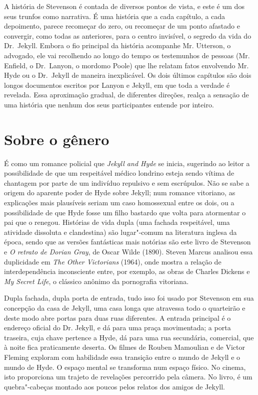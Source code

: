 A história de Stevenson é contada de diversos pontos de vista, e este é
um dos seus trunfos como narrativa.  É uma história que a cada
capítulo, a cada depoimento, parece recomeçar do zero, ou recomeçar de
um ponto afastado e convergir, como todas as anteriores, para o centro
invisível, o segredo da vida do Dr.~Jekyll.  Embora o fio principal da
história acompanhe Mr. Utterson, o advogado, ele vai recolhendo ao
longo do tempo os testemunhos de pessoas (Mr. Enfield, o Dr.~Lanyon, o
mordomo Poole) que lhe relatam fatos envolvendo Mr. Hyde ou o Dr.~Jekyll 
de maneira inexplicável. Os dois últimos capítulos são dois
longos documentos escritos por Lanyon e Jekyll, em que toda a verdade é
revelada.  Essa aproximação gradual, de diferentes direções, realça a
sensação de uma história que nenhum dos seus participantes entende por
inteiro.  



\section{Sobre o gênero}
É como um romance policial que \textit{Jekyll and Hyde} se inicia,
sugerindo ao leitor a possibilidade de que um respeitável médico
londrino esteja sendo vítima de chantagem por parte de um indivíduo
repulsivo e sem escrúpulos.  Não se sabe a origem do aparente poder de
Hyde sobre Jekyll; num romance vitoriano, as explicações mais
plausíveis seriam um caso homossexual entre os dois, ou a possibilidade
de que Hyde fosse um filho bastardo que volta para atormentar o pai que
o renegou.  Histórias de vida dupla (uma fachada respeitável, uma
atividade dissoluta e clandestina) são lugar"-comum na literatura
inglesa da época, sendo que as versões fantásticas mais notórias são
este livro de Stevenson e \textit{O retrato de Dorian
Gray}, de Oscar Wilde (1890).  Steven Marcus analisou essa duplicidade
em \textit{The Other Victorians} (1964), onde mostra a relação de
interdependência inconsciente entre, por exemplo, as obras de Charles
Dickens e \textit{My Secret Life}, o clássico anônimo da pornografia
vitoriana. 

Dupla fachada, dupla porta de entrada, tudo isso foi usado por Stevenson
em sua concepção da casa de Jekyll, uma casa longa que atravessa todo o
quarteirão e deste modo abre portas para duas ruas diferentes.  A
entrada principal é o endereço oficial do Dr. Jekyll, e dá para uma
praça movimentada; a porta traseira, cuja chave pertence a Hyde, dá
para uma rua secundária, comercial, que à noite fica praticamente
deserta.  Os filmes de Rouben Mamoulian e de Victor Fleming exploram
com habilidade essa transição entre o mundo de Jekyll e o mundo de
Hyde.  O espaço mental se transforma num espaço físico. No cinema, isto
proporciona um trajeto de revelações percorrido pela câmera. No livro,
é um quebra"-cabeças montado aos poucos pelos relatos dos amigos de
Jekyll. 

